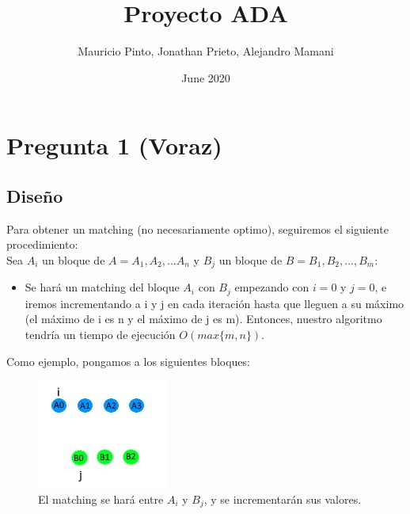 \documentclass{article}
\title{Proyecto ADA}
\author{Mauricio Pinto, Jonathan Prieto, Alejandro Mamani}
\date{June 2020}
\begin{document}
\maketitle

\section{Pregunta 1 (Voraz)}
\subsection{Diseño}
Para obtener un matching (no necesariamente optimo), seguiremos el siguiente procedimiento:\\
 Sea $A_i$ un bloque de $A = A_1, A_2, ... A_n$ y $B_j$ un bloque de $B = B_1, B_2, ..., B_m$: 
 \begin{itemize}
     \item Se hará un matching del bloque $A_i$ con $B_j$ empezando con $i = 0$ y $j = 0$, e iremos incrementando a i y j en cada iteración hasta que lleguen a su máximo (el máximo de i es n y el máximo de j es m). Entonces, nuestro algoritmo tendría un tiempo de ejecución $O (max\{m,n\})$.
\end{itemize}
    Como ejemplo, pongamos a los siguientes bloques:\\
\begin{figure}
\centering
\includegraphics[scale=1]{ada1.jpeg}
\caption{El matching se hará entre $A_i$ y $B_j$, y se incrementarán sus valores.}
\end{figure}
\end{document}
